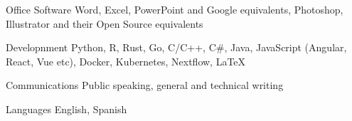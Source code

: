 

\begin{cvskills}

  \cvskill
    {Office Software} %
    {Word, Excel, PowerPoint and Google equivalents, Photoshop, Illustrator and their Open Source equivalents} %

  \cvskill
    {Developnment} %
    {Python, R, Rust, Go, C/C++, C\#, Java, JavaScript (Angular, React, Vue etc), Docker, Kubernetes, Nextflow, \LaTeX} %
    
  \cvskill
    {Communications} 
    {Public speaking, general and technical writing}

  \cvskill
    {Languages} %
    {English, Spanish} %


\end{cvskills}
